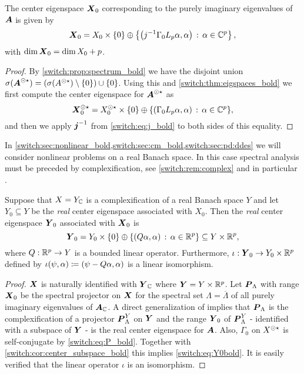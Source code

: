 \begin{corollary}
  \label{switch:cor:center_subspace_bold}
  The center eigenspace $\boldsymbol{X}_0$ corresponding to the purely imaginary eigenvalues of $\boldsymbol{A}$ is given by
  \[
    \boldsymbol{X}_0 = X_0 \times \{0\} \oplus \left\{ \left(j^{-1}\Gamma_0L_p\alpha, \alpha \right) \,:\, \alpha \in \mathbb{C}^p \right\},
  \]
  with $\operatorname{dim}{\boldsymbol{X}_0} = \operatorname{dim}{X_0} + p$.
\end{corollary}
\begin{proof}
  By \cref{switch:prop:spectrum_bold} we have the disjoint union $\sigma(\boldsymbol{A}^{\odot\star}) = (\sigma(A^{\odot\star}) \setminus \{0\}) \cup \{0\}$. Using this and \cref{switch:thm:eigspaces_bold} we first compute the center eigenspace for $\boldsymbol{A}^{\odot\star}$ as
  \[
    \boldsymbol{X}_0^{\odot\star} = X_0^{\odot\star} \times \{0\} \oplus \{(\Gamma_0L_p\alpha,\alpha)\,:\,\alpha \in \mathbb{C}^p\},
  \]
  and then we apply $\boldsymbol{j}^{-1}$ from \cref{switch:eq:j_bold} to both sides of this equality.
\end{proof}

In \cref{switch:sec:nonlinear_bold,switch:sec:cm_bold,switch:sec:pd:ddes} we will consider nonlinear problems on a real Banach space. In this case spectral analysis must be preceded by complexification, see \cref{switch:rem:complex} and in particular \cite[last part of Section IV.2]{diekmann1995delay}.

\begin{proposition}
  \label{switch:prop:real_center_subspace_bold}
  Suppose that $X = Y_{\mathbb{C}}$ is a complexification of a real Banach space $Y$ and let $Y_0 \subseteq Y$ be the \emph{real} center eigenspace associated with $X_0$. Then the \emph{real} center eigenspace $\boldsymbol{Y}_0$ associated with $\boldsymbol{X}_0$ is
  \begin{equation}
    \label{switch:eq:Y0bold}
    \boldsymbol{Y}_0 = Y_0 \times \{0\} \oplus \left\{\left(Q\alpha, \alpha \right) \,:\, \alpha \in \mathbb{R}^p \right\} \subseteq Y \times \mathbb{R}^{p},
  \end{equation}
  where $Q : \mathbb{R}^p \to Y$ is a bounded linear operator. Furthermore, $\iota : \boldsymbol{Y}_0 \to Y_0 \times \mathbb{R}^p$ defined by $\iota(\psi, \alpha) \coloneqq (\psi - Q\alpha, \alpha)$ is a linear isomorphism.
\end{proposition}
\begin{proof}
  $\boldsymbol{X}$ is naturally identified with $\boldsymbol{Y}_{\mathbb{C}}$ where $\boldsymbol{Y} = Y \times \mathbb{R}^p$. Let $\boldsymbol{P}_{\Lambda}$ with range $\boldsymbol{X}_0$ be the spectral projector on $\boldsymbol{X}$ for the spectral set $\Lambda = \overline{\Lambda}$ of all purely imaginary eigenvalues of $\boldsymbol{A}_{\mathbb{C}}$. A direct generalization of \cite[Corollary IV.2.19]{diekmann1995delay} implies that $\boldsymbol{P}_{\Lambda}$ is the complexification of a projector $\boldsymbol{P}_{\Lambda}^Y$ on $\boldsymbol{Y}$ and the range $\boldsymbol{Y}_0$ of $\boldsymbol{P}_{\Lambda}^Y$ - identified with a subspace of $\boldsymbol{Y}$ - is the real center eigenspace for $\boldsymbol{A}$. Also, $\Gamma_0$ on $X^{\odot\star}$ is self-conjugate by \cref{switch:eq:P_bold}. Together with \cref{switch:cor:center_subspace_bold} this implies \cref{switch:eq:Y0bold}. It is easily verified that the linear operator $\iota$ is an isomorphism.
\end{proof}

